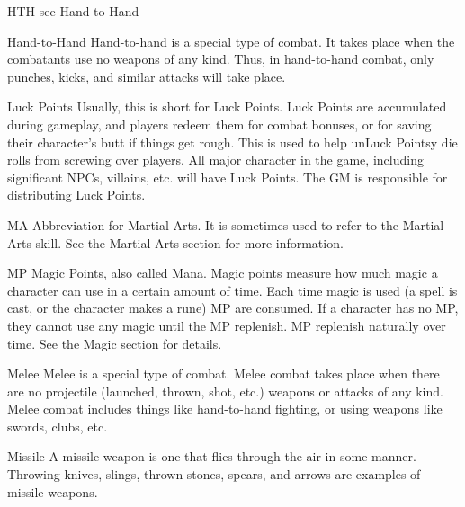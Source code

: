 \documentclass[twoside]{book}
\begin{document}
              
               HTH   
                see Hand-to-Hand   
              
              
               Hand-to-Hand   
                  Hand-to-hand is a special type of combat. It
                 takes place when the combatants use no weapons of any
                 kind. Thus, in hand-to-hand combat, only punches, kicks,
                 and similar attacks will take place. 
              
              
               Luck Points   
                  Usually, this is short for Luck Points. Luck
                 Points are accumulated during gameplay, and players
                 redeem them for combat bonuses, or for saving their
                 character’s butt if things get rough. This is used
                 to help unLuck Pointsy die rolls from screwing over
                 players. All major character in the game, including
                 significant NPCs, villains, etc. will have Luck Points.
                 The GM is responsible for distributing Luck Points.
                 
              
              
               MA   
                  Abbreviation for Martial Arts. It is sometimes
                 used to refer to the Martial Arts skill. See the Martial
                 Arts section for more information. 
              
              
               MP   
                  Magic Points, also called Mana. Magic points
                 measure how much magic a character can use in a certain
                 amount of time. Each time magic is used (a spell is
                 cast, or the character makes a rune) MP are consumed. If
                 a character has no MP, they cannot use any magic until
                 the MP replenish. MP replenish naturally over time. See
                 the Magic section for details. 
              
              
               Melee   
                  Melee is a special type of combat. Melee combat
                 takes place when there are no projectile (launched,
                 thrown, shot, etc.) weapons or attacks of any kind.
                 Melee combat includes things like hand-to-hand fighting,
                 or using weapons like swords, clubs, etc. 
              
              
               Missile   
                  A missile weapon is one that flies through the
                 air in some manner. Throwing knives, slings, thrown
                 stones, spears, and arrows are examples of missile
                 weapons. 
              
\end{document}

